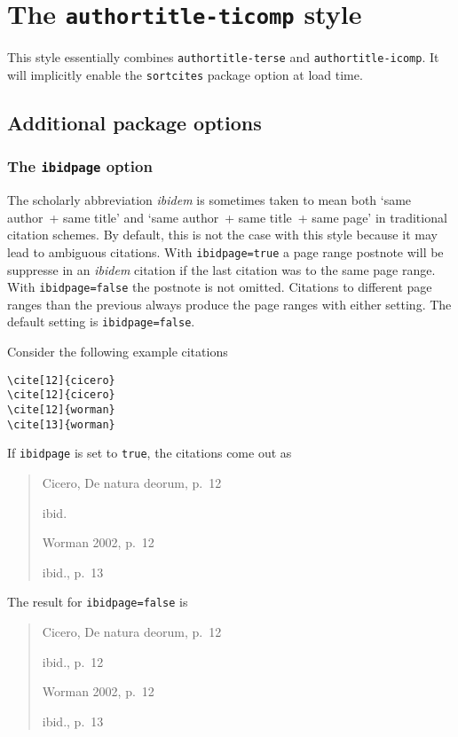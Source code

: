 \documentclass[a4paper]{article}
\begin{document}
\section*{The \texttt{authortitle-ticomp} style}

This style essentially combines \texttt{authortitle-terse} and
\texttt{authortitle-icomp}. It will implicitly enable the
\texttt{sortcites} package option at load time.

\subsection*{Additional package options}

\subsubsection*{The \texttt{ibidpage} option}

The scholarly abbreviation \emph{ibidem} is sometimes taken to mean
both `same author~+ same title' and `same author~+ same title~+ same
page' in traditional citation schemes. By default, this is not the
case with this style because it may lead to ambiguous citations.
With \texttt{ibidpage=true} a page range postnote will be suppresse
in an \emph{ibidem} citation if the last citation was to the same
page range. With \texttt{ibidpage=false} the postnote is not omitted.
Citations to different page ranges than the previous always produce
the page ranges with either setting.
The default setting is \texttt{ibidpage=false}.

Consider the following example citations
\begin{verbatim}
\cite[12]{cicero}
\cite[12]{cicero}
\cite[12]{worman}
\cite[13]{worman}
\end{verbatim}
%
If \texttt{ibidpage} is set to \texttt{true}, the citations
come out as
\begin{quote}
Cicero, De natura deorum, p.~12

ibid.

Worman 2002, p.~12

ibid., p.~13
\end{quote}
%
The result for \texttt{ibidpage=false} is
\begin{quote}
Cicero, De natura deorum, p.~12

ibid., p.~12

Worman 2002, p.~12

ibid., p.~13
\end{quote}
\end{document}
